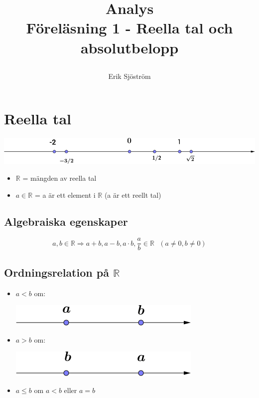 

\title{
     Analys\\
     Föreläsning 1 - Reella tal och absolutbelopp
    \author{Erik Sjöström}
}

\maketitle

\section{Reella tal}

\begin{center}
    \includegraphics[scale=0.5]{linje.png}
\end{center}

\begin{itemize}
    \item $\mathbb{R}$ = mängden av reella tal\\
    \item $a \in \mathbb{R}$ = a är ett element i $\mathbb{R}$ (a är ett reellt tal)
\end{itemize}

\subsection{Algebraiska egenskaper} %
\label{sub:algebraiska_egenskaper}

\[
a,b \in \mathbb{R} \Rightarrow a + b, a - b, a \cdot b, \frac{a}{b} \in \mathbb{R} \mbox{ }(a \neq 0, b \neq 0)
\]

\subsection{Ordningsrelation på $\mathbb{R}$} %
\label{sub:ordningsrelation_p_}
\begin{itemize}
    \item $a < b$ om:
    \begin{center}
        \includegraphics[scale=0.5]{mindre.png}
    \end{center}
    \item $a > b$ om:
    \begin{center}
        \includegraphics[scale=0.5]{storre.png}
    \end{center}
    \item $a \le b$ om $a < b$ eller $a = b$
\end{itemize}
